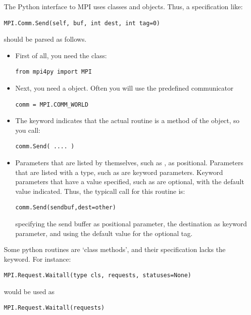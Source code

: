 The Python interface to MPI uses classes and objects. Thus, a
specification like:
\begin{verbatim}
MPI.Comm.Send(self, buf, int dest, int tag=0)
\end{verbatim}
should be parsed as follows.
\begin{itemize}
\item First of all, you need the  class:
\begin{verbatim}
from mpi4py import MPI
\end{verbatim}
\item Next, you need a  object. Often you will use the
  predefined communicator
\begin{verbatim}
comm = MPI.COMM_WORLD
\end{verbatim}
\item The keyword  indicates that the actual routine 
  is a method of the  object, so you call:
\begin{verbatim}
comm.Send( .... )
\end{verbatim}
\item Parameters that are listed by themselves, such as , as
  positional. Parameters that are listed with a type, such as  are keyword parameters. Keyword parameters that have a value
  specified, such as  are optional, with the default
  value indicated. Thus, the typicall call for this routine is:
\begin{verbatim}
comm.Send(sendbuf,dest=other)
\end{verbatim}
  specifying the send buffer as positional parameter, the destination
  as keyword parameter, and using the default value for the optional tag.
\end{itemize}
Some python routines are `class methods', and their specification
lacks the  keyword. For instance:
\begin{verbatim}
MPI.Request.Waitall(type cls, requests, statuses=None)
\end{verbatim}
would be used as
\begin{verbatim}
MPI.Request.Waitall(requests)
\end{verbatim}

